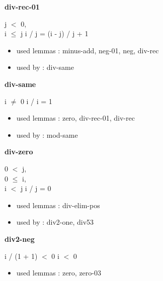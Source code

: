 \documentclass[a4paper]{article}
\begin{document}
\bigskip

{\large\bf div-rec-01}

\medskip

j $<$ 0, \\
i $\le$ j \Fol i / j = (i - j) / j + 1

\begin{itemize}


\item       used lemmas  : minus-add, neg-01, neg, div-rec
\item       used by      : div-same

\end{itemize}

\medskip

\bigskip

{\large\bf div-same}

\medskip

i $\neq$ 0 \Fol i / i = 1

\begin{itemize}


\item       used lemmas  : zero, div-rec-01, div-rec
\item       used by      : mod-same

\end{itemize}

\medskip

\bigskip

{\large\bf div-zero}

\medskip

0 $<$ j, \\
0 $\le$ i, \\
i $<$ j \Fol i / j = 0

\begin{itemize}


\item       used lemmas  : div-elim-pos
\item       used by      : div2-one, div53

\end{itemize}

\medskip

\bigskip

{\large\bf div2-neg}

\medskip

 \Fol i / (1 + 1) $<$ 0 \Imp i $<$ 0

\begin{itemize}


\item       used lemmas  : zero, zero-03

\end{itemize}
\end{document}
